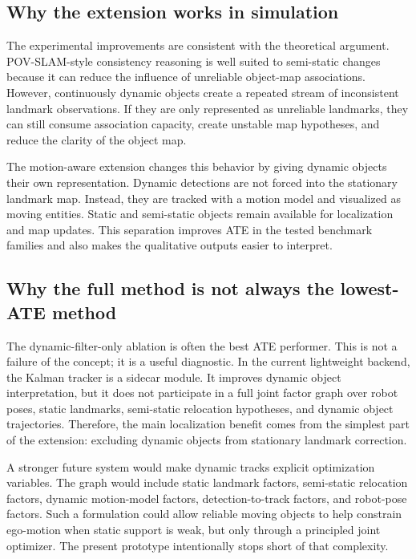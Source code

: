 ﻿\documentclass[11pt]{article}
\begin{document}
\subsection{Why the extension works in simulation}
The experimental improvements are consistent with the theoretical argument. POV-SLAM-style consistency reasoning is well suited to semi-static changes because it can reduce the influence of unreliable object-map associations. However, continuously dynamic objects create a repeated stream of inconsistent landmark observations. If they are only represented as unreliable landmarks, they can still consume association capacity, create unstable map hypotheses, and reduce the clarity of the object map.

The motion-aware extension changes this behavior by giving dynamic objects their own representation. Dynamic detections are not forced into the stationary landmark map. Instead, they are tracked with a motion model and visualized as moving entities. Static and semi-static objects remain available for localization and map updates. This separation improves ATE in the tested benchmark families and also makes the qualitative outputs easier to interpret.

\subsection{Why the full method is not always the lowest-ATE method}
The dynamic-filter-only ablation is often the best ATE performer. This is not a failure of the concept; it is a useful diagnostic. In the current lightweight backend, the Kalman tracker is a sidecar module. It improves dynamic object interpretation, but it does not participate in a full joint factor graph over robot poses, static landmarks, semi-static relocation hypotheses, and dynamic object trajectories. Therefore, the main localization benefit comes from the simplest part of the extension: excluding dynamic objects from stationary landmark correction.

A stronger future system would make dynamic tracks explicit optimization variables. The graph would include static landmark factors, semi-static relocation factors, dynamic motion-model factors, detection-to-track factors, and robot-pose factors. Such a formulation could allow reliable moving objects to help constrain ego-motion when static support is weak, but only through a principled joint optimizer. The present prototype intentionally stops short of that complexity.
\end{document}
